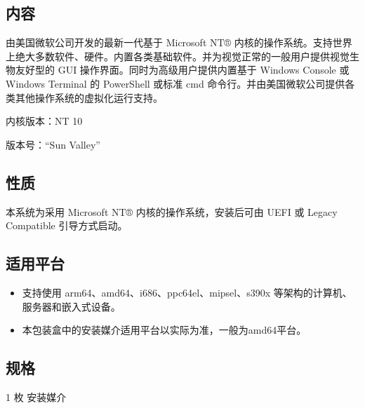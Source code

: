 \documentclass{article}
\begin{document}
\begin{multicols*}{3}
	\medskip


	\begin{tcolorbox}
	\section*{内容}
	\end{tcolorbox}

	由美国微软公司开发的最新一代基于 Microsoft NT® 内核的操作系统。支持世界上绝大多数软件、硬件。内置各类基础软件。并为视觉正常的一般用户提供视觉生物友好型的 GUI 操作界面。同时为高级用户提供内置基于 Windows Console 或 Windows Terminal 的 PowerShell 或标准 cmd 命令行。并由美国微软公司提供各类其他操作系统的虚拟化运行支持。

	 内核版本：NT 10

	 版本号：“Sun Valley”

	\medskip


	\begin{tcolorbox}
	\section*{性质}
	\end{tcolorbox}

	本系统为采用 Microsoft NT® 内核的操作系统，安装后可由 UEFI 或 Legacy Compatible 引导方式启动。

	\medskip


	\begin{tcolorbox}
	\section*{适用平台}
	\end{tcolorbox}

	\begin{itemize}
		\item 支持使用 arm64、amd64、i686、ppc64el、mipsel、s390x 等架构的计算机、服务器和嵌入式设备。
		\item 本包装盒中的安装媒介适用平台以实际为准，一般为amd64平台。
	\end{itemize}


	\begin{tcolorbox}
	\section*{规格}
	\end{tcolorbox}

	1 枚 安装媒介

	\medskip


\end{multicols*}
\end{document}
